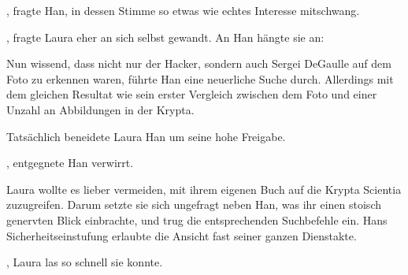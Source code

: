 \par

, fragte Han, in dessen Stimme so etwas wie echtes Interesse mitschwang.

\par

, fragte Laura eher an sich selbst gewandt. An Han hängte sie an: 

\par

Nun wissend, dass nicht nur der Hacker, sondern auch Sergei DeGaulle auf dem Foto zu erkennen waren, führte Han eine neuerliche Suche durch. Allerdings mit dem gleichen Resultat wie sein erster Vergleich zwischen dem Foto und einer Unzahl an Abbildungen in der Krypta. 

\par

Tatsächlich beneidete Laura Han um seine hohe Freigabe. 

\par

, entgegnete Han verwirrt. 

\par

Laura wollte es lieber vermeiden, mit ihrem eigenen Buch auf die Krypta Scientia zuzugreifen. Darum setzte sie sich ungefragt neben Han, was ihr einen stoisch genervten Blick einbrachte, und trug die entsprechenden Suchbefehle ein. Hans Sicherheitseinstufung erlaubte die Ansicht fast seiner ganzen Dienstakte.

\par

, Laura las so schnell sie konnte. 

\par

